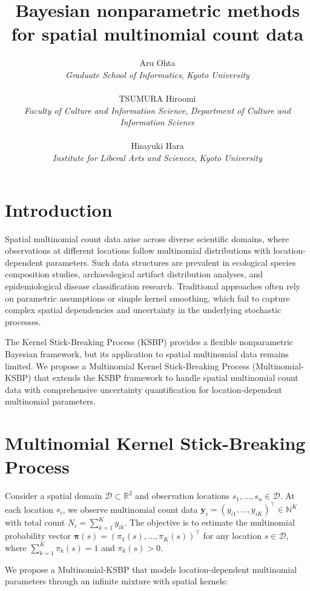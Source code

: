 \documentclass[a4paper,11pt]{article}
\title{Bayesian nonparametric methods for spatial multinomial count data}
\author{Aru Ohta\\
\small{\textit{Graduate School of Informatics},
\textit{Kyoto University}}\\
\ \\
TSUMURA Hiroomi\\
\small{\textit{Faculty of Culture and Information Science},
\textit{Department of Culture and Information Science}}\\
\ \\
Hisayuki Hara\\
\small {\textit{Institute for Liberal Arts and Sciences},
\textit{Kyoto University}}}
\date{}
\begin{document}
\maketitle

\vspace{-1cm}
\section{Introduction}
\vspace{-0.25cm}
Spatial multinomial count data arise across diverse scientific domains, where observations at different locations follow multinomial distributions with location-dependent parameters. Such data structures are prevalent in ecological species composition studies, archaeological artifact distribution analyses, and epidemiological disease classification research. Traditional approaches often rely on parametric assumptions or simple kernel smoothing, which fail to capture complex spatial dependencies and uncertainty in the underlying stochastic processes.

The Kernel Stick-Breaking Process (KSBP) provides a flexible nonparametric Bayesian framework, but its application to spatial multinomial data remains limited. We propose a Multinomial Kernel Stick-Breaking Process (Multinomial-KSBP) that extends the KSBP framework to handle spatial multinomial count data with comprehensive uncertainty quantification for location-dependent multinomial parameters.

\vspace{-0.4cm}
\section{Multinomial Kernel Stick-Breaking Process}
\vspace{-0.25cm}
Consider a spatial domain $\mathcal{D} \subset \mathbb{R}^2$ and observation locations $s_1, \ldots, s_n \in \mathcal{D}$. At each location $s_i$, we observe multinomial count data $\mathbf{y}_i = (y_{i1}, \ldots, y_{iK})^\top \in \mathbb{N}^K$ with total count $N_i = \sum_{k=1}^K y_{ik}$. The objective is to estimate the multinomial probability vector $\boldsymbol{\pi}(s) = (\pi_1(s), \ldots, \pi_K(s))^\top$ for any location $s \in \mathcal{D}$, where $\sum_{k=1}^K \pi_k(s) = 1$ and $\pi_k(s) > 0$.

We propose a Multinomial-KSBP that models location-dependent multinomial parameters through an infinite mixture with spatial kernels:
\end{document}
